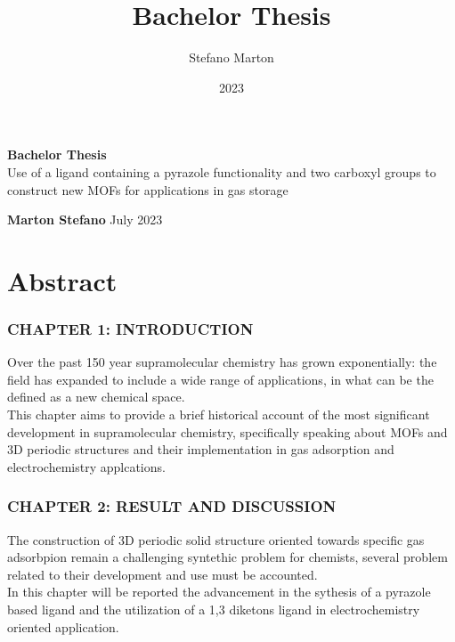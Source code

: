 \documentclass[a4,11pt]{report}
\title{Bachelor Thesis}
\author{Stefano Marton}
\date{2023}
\begin{document}
\begin{titlepage}
	\begin{center}
		\vspace*{6cm}
		\Huge
		\textbf{Bachelor Thesis}\\
		\vspace{0.5cm}
		\LARGE
		\vspace{1.5cm}
		Use of a ligand containing a pyrazole functionality and two carboxyl groups to construct new MOFs for applications in gas storage

		\vspace{1.5cm}
		\textbf{Marton Stefano}
		\vfill
		July 2023
		\vspace{0.8cm}
	\end{center}
\end{titlepage}
\vspace{1cm}

\chapter*{Abstract}

\subsection*{CHAPTER 1: INTRODUCTION}

Over the past 150 year supramolecular chemistry has grown exponentially: the field has expanded to include a wide range of applications, in what can be the defined as a new chemical space.\\
This chapter aims to provide a brief historical account of the most significant development in supramolecular chemistry, specifically speaking about MOFs and 3D periodic structures and their implementation in gas adsorption and electrochemistry applcations.

\newline\subsection*{CHAPTER 2: RESULT AND DISCUSSION}

The construction of 3D periodic solid structure oriented towards specific gas adsorbpion remain a challenging syntethic problem for chemists, several problem related to their development and use must be accounted.\\
In this chapter will be reported the advancement in the sythesis of a pyrazole based ligand and the utilization of a 1,3 diketons ligand in electrochemistry oriented application.
\end{document}
